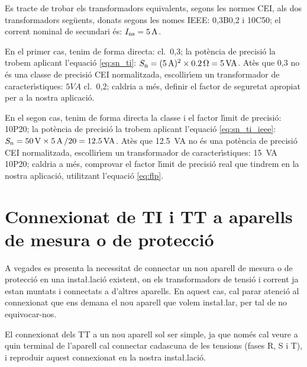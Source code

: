 \begin{exemple}
    Es tracte de trobar els transformadors equivalents, segons les normes \textsf{CEI}, als dos
    transformadors seg\"{u}ents, donats segons les nomes \textsf{IEEE}: 0,3B0,2 i
    10C50; el corrent nominal de secundari \'{e}s:    $I_\mathrm{ns}=5\mathrm{\,A}$.

    En el primer cas, tenim de forma directa: cl.~0,3; la pot\`{e}ncia de precisi\'{o} la trobem
    aplicant l'equaci\'{o} \eqref{eq:sn_ti}: $S_\mathrm{n} =(\SI{5}{A})^2 \times \SI{0,2}{\ensuremath{\mathrm{\Omega}}} =
    \SI{5}{VA}$.
    At\`{e}s que 0,3 no \'{e}s una classe de precisi\'{o} \textsf{CEI} normalitzada,
    escollir\'{\i}em un transformador de caracter\'{\i}stiques:
    $5\unit{VA}$ cl.~0,2; caldria a m\'{e}s, definir el factor de
    seguretat apropiat per a la nostra aplicaci\'{o}.

    En el segon cas, tenim de forma directa la classe i el factor l\'{\i}mit de
    precisi\'{o}: 10P20; la pot\`{e}ncia de precisi\'{o} la trobem
    aplicant l'equaci\'{o} \eqref{eq:sn_ti_ieee}: $S_\mathrm{n} = \SI{50}{V} \times
    \SI{5}{A}\, / 20 = \SI{12,5}{VA}$.
    At\`{e}s que \SI{12,5}{VA} no \'{e}s una pot\`{e}ncia de precisi\'{o} \textsf{CEI} normalitzada,
     escollir\'{\i}em un transformador de caracter\'{\i}stiques:
    \SI{15}{VA} 10P20; caldria a m\'{e}s, comprovar el factor l\'{\i}mit de precisi\'{o} real
    que tindrem en la nostra aplicaci\'{o}, utilitzant l'equaci\'{o} \eqref{eq:flp}.

\end{exemple}

\section{Connexionat de TI i TT a aparells de mesura o de
protecci\'{o}}\label{sec:conex_ti_tt}

A vegades es presenta la necessitat de connectar un nou aparell de
mesura o de protecci\'{o} en una insta{\l.l}aci\'{o} existent, on els
transformadors de tensi\'{o} i corrent ja estan muntats i connectats a
d'altres aparells. En aquest cas, cal parar atenci\'{o} al connexionat
que ens demana el nou aparell que volem insta{\l.l}ar, per tal de no
equivocar-nos.

El connexionat dels TT a un nou aparell sol ser simple, ja que nom\'{e}s
cal veure a quin terminal de l'aparell cal connectar cadascuna de
les tensions (fases R, S i T), i reproduir aquest connexionat en la
nostra insta{\l.l}aci\'{o}.


